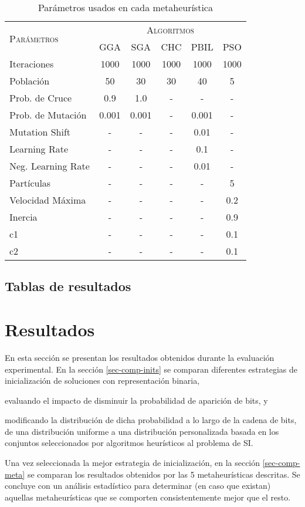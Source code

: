 \begin{table}[h!]
\centering
\begin{tabular}{l c c c c c}
\hline
\multirow{2}{*}{\textsc{Parámetros}}
	& \multicolumn{5}{c}{\textsc{Algoritmos}} \\\cline{2-6}
	& GGA & SGA & CHC & PBIL & PSO \\
\hline
\hline
Iteraciones        &  1000 &  1000 &  1000 &  1000 &  1000 \\
Población          &    50 &    30 &    30 &    40 &     5 \\
Prob. de Cruce     &   0.9 &   1.0 &     - &     - &     - \\
Prob. de Mutación  & 0.001 & 0.001 &     - & 0.001 &     - \\
Mutation Shift     &     - &     - &     - &  0.01 &     - \\
Learning Rate      &     - &     - &     - &   0.1 &     - \\
Neg. Learning Rate &     - &     - &     - &  0.01 &     - \\
Partículas         &     - &     - &     - &     - &     5 \\
Velocidad Máxima   &     - &     - &     - &     - &   0.2 \\
Inercia            &     - &     - &     - &     - &   0.9 \\
c1                 &     - &     - &     - &     - &   0.1 \\
c2                 &     - &     - &     - &     - &   0.1 \\
\hline
\end{tabular}
\caption{Parámetros usados en cada metaheurística}
\label{table-parameters}
\end{table}

\subsection{Tablas de resultados}

\section{Resultados}

En esta sección se presentan los resultados obtenidos durante la evaluación experimental. En la sección \ref{sec-comp-inits} se comparan diferentes estrategias de inicialización de soluciones con representación binaria,
\begin{inparaenum}
\item evaluando el impacto de disminuir la probabilidad de aparición de bits, y
\item modificando la distribución de dicha probabilidad a lo largo de la cadena de bits, de una distribución uniforme a una distribución personalizada basada en los conjuntos seleccionados por algoritmos heurísticos al problema de SI.
\end{inparaenum}
Una vez seleccionada la mejor estrategia de inicialización, en la sección \ref{sec-comp-meta} se comparan los resultados obtenidos por las 5 metaheurísticas descritas. Se concluye con un análisis estadístico para determinar (en caso que existan) aquellas metaheurísticas que se comporten consistentemente mejor que el resto.

